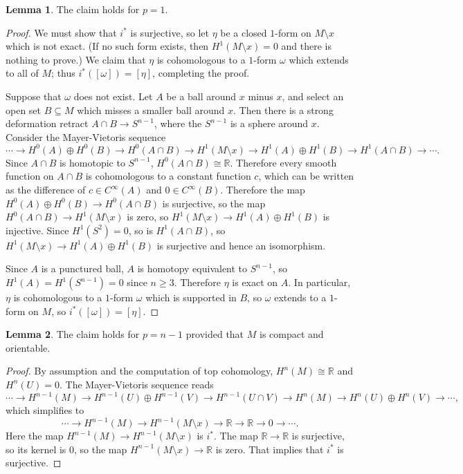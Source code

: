 \documentclass[10pt]{article}
\newcommand{\RR}{\mathbb{R}}
\theoremstyle{definition}
\newtheorem{lemma}{Lemma}[exer]
\begin{document}
\begin{lemma}
The claim holds for $p = 1$.
\end{lemma}
\begin{proof}
We must show that $i^*$ is surjective, so let $\eta$ be a closed $1$-form on $M \setminus x$ which is not exact.
(If no such form exists, then $H^1(M \setminus x) = 0$ and there is nothing to prove.)
We claim that $\eta$ is cohomologous to a $1$-form $\omega$ which extends to all of $M$; thus $i^*([\omega]) = [\eta]$, completing the proof.

Suppose that $\omega$ does not exist.
Let $A$ be a ball around $x$ minus $x$, and select an open set $B \subseteq M$ which misses a smaller ball around $x$.
Then there is a strong deformation retract $A \cap B \to S^{n-1}$, where the $S^{n-1}$ is a sphere around $x$.
Consider the Mayer-Vietoris sequence
$$
\cdots \to H^0(A) \oplus H^0(B) \to H^0(A \cap B) \to H^1(M \setminus x) \to H^1(A) \oplus H^1(B) \to H^1(A \cap B) \to \cdots.
$$
Since $A \cap B$ is homotopic to $S^{n-1}$, $H^0(A \cap B) \cong \RR$.
Therefore every smooth function on $A \cap B$ is cohomologous to a constant function $c$, which can be written as the difference of $c \in C^\infty(A)$ and $0 \in C^\infty(B)$.
Therefore the map $H^0(A) \oplus H^0(B) \to H^0(A \cap B)$ is surjective, so the map $H^0(A \cap B) \to H^1(M \setminus x)$ is zero, so $H^1(M \setminus x) \to H^1(A) \oplus H^1(B)$ is injective.
Since $H^1(S^2) = 0$, so is $H^1(A \cap B)$, so $H^1(M \setminus x) \to H^1(A) \oplus H^1(B)$ is surjective and hence an isomorphism.

Since $A$ is a punctured ball, $A$ is homotopy equivalent to $S^{n-1}$, so $H^1(A) = H^1(S^{n-1}) = 0$ since $n \geq 3$.
Therefore $\eta$ is exact on $A$.
In particular, $\eta$ is cohomologous to a $1$-form $\omega$ which is supported in $B$, so $\omega$ extends to a $1$-form on $M$, so $i^*([\omega]) = [\eta]$.
\end{proof}

\begin{lemma}
The claim holds for $p = n - 1$ provided that $M$ is compact and orientable.
\end{lemma}
\begin{proof}
By assumption and the computation of top cohomology, $H^n(M) \cong \RR$ and $H^n(U) = 0$.
The Mayer-Vietoris sequence reads
$$\cdots \to H^{n-1}(M) \to H^{n-1}(U) \oplus H^{n-1}(V) \to H^{n-1}(U \cap V) \to H^n(M) \to H^n(U) \oplus H^n(V) \to \cdots,$$
which simplifies to
$$\cdots \to H^{n-1}(M) \to H^{n-1}(M \setminus x) \to \RR \to \RR \to 0 \to \cdots.$$
Here the map $H^{n-1}(M) \to H^{n-1}(M \setminus x)$ is $i^*$.
The map $\RR \to \RR$ is surjective, so its kernel is $0$, so the map $H^{n-1}(M \setminus x) \to \RR$ is zero.
That implies that $i^*$ is surjective.
\end{proof}
\end{document}
